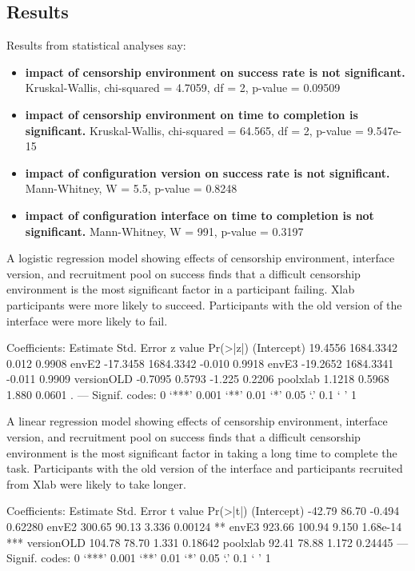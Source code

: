 \documentclass[USenglish,oneside,twocolumn]{article}
\begin{document}
\subsection{Results} 
Results from statistical analyses say: 
\begin{itemize} 
	\item{{\bfseries impact of censorship environment on success rate is not significant.} 
	Kruskal-Wallis, chi-squared = 4.7059, df = 2, p-value = 0.09509}
	\item{{\bfseries impact of censorship environment on time to completion is significant.} 
	Kruskal-Wallis, chi-squared = 64.565, df = 2, p-value = 9.547e-15}
	\item{{\bfseries impact of configuration version on success rate is not significant.}
	Mann-Whitney, W = 5.5, p-value = 0.8248}
	\item{{\bfseries impact of configuration interface on time to completion is not significant.} 
	Mann-Whitney, W = 991, p-value = 0.3197}
\end{itemize} 

A logistic regression model showing effects of censorship environment, interface version,
and recruitment pool on success finds that a difficult censorship environment is the most
significant factor in a participant failing. Xlab participants were more likely to succeed. 
Participants with the old version of the interface were more likely to fail. 

Coefficients:
             Estimate Std. Error z value Pr(>|z|)  
(Intercept)   19.4556  1684.3342   0.012   0.9908  
envE2        -17.3458  1684.3342  -0.010   0.9918  
envE3        -19.2652  1684.3341  -0.011   0.9909  
versionOLD    -0.7095     0.5793  -1.225   0.2206  
poolxlab       1.1218     0.5968   1.880   0.0601 .
---
Signif. codes:  0 ‘***’ 0.001 ‘**’ 0.01 ‘*’ 0.05 ‘.’ 0.1 ‘ ’ 1

A linear regression model showing effects of censorship environment, interface version, 
and recruitment pool on success finds that a difficult censorship environment is the most
significant factor in taking a long time to complete the task. Participants with the old version
of the interface and participants recruited from Xlab were likely to take longer. 

Coefficients:
            Estimate Std. Error t value Pr(>|t|)    
(Intercept)   -42.79      86.70  -0.494  0.62280    
envE2         300.65      90.13   3.336  0.00124 ** 
envE3         923.66     100.94   9.150 1.68e-14 ***
versionOLD    104.78      78.70   1.331  0.18642    
poolxlab       92.41      78.88   1.172  0.24445    
---
Signif. codes:  0 ‘***’ 0.001 ‘**’ 0.01 ‘*’ 0.05 ‘.’ 0.1 ‘ ’ 1
\end{document}
